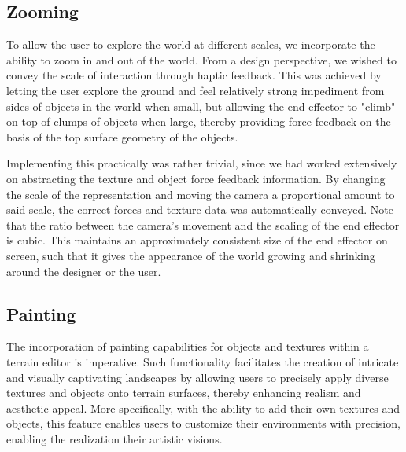 \subsection{Zooming}
To allow the user to explore the world at different scales, we incorporate the ability to zoom in and out of the world. From a design perspective, we wished to convey the scale of interaction through haptic feedback. This was achieved by letting the user explore the ground and feel relatively strong impediment from sides of objects in the world when small, but allowing the end effector to "climb" on top of clumps of objects when large, thereby providing force feedback on the basis of the top surface geometry of the objects. 

Implementing this practically was rather trivial, since we had worked extensively on abstracting the texture and object force feedback information. By changing the scale of the representation and moving the camera a proportional amount to said scale, the correct forces and texture data was automatically conveyed. Note that the ratio between the camera's movement and the scaling of the end effector is cubic. This maintains an approximately consistent size of the end effector on screen, such that it gives the appearance of the world growing and shrinking around the designer or the user.

\subsection{Painting}
The incorporation of painting capabilities for objects and textures within a terrain editor is imperative. 
Such functionality facilitates the creation of intricate and visually captivating landscapes by allowing users to precisely apply diverse textures and objects onto terrain surfaces, thereby enhancing realism and aesthetic appeal. 
More specifically, with the ability to add their own textures and objects, this feature enables users to customize their environments with precision, enabling the realization their artistic visions. 

